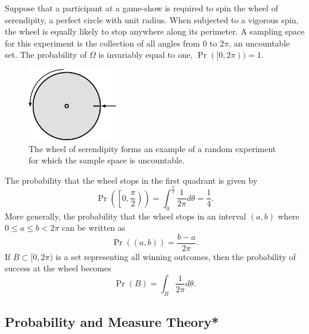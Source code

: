 \begin{example}
Suppose that a participant at a game-show is required to spin the wheel of serendipity, a perfect circle with unit radius.
When subjected to a vigorous spin, the wheel is equally likely to stop anywhere along its perimeter.
A sampling space for this experiment is the collection of all angles from $0$ to $2 \pi$, an uncountable set.
The probability of $\Omega$ is invariably equal to one, $\Pr ([0, 2 \pi)) = 1$.

\begin{figure}[tbh!]
\begin{center}
\includegraphics[height=3.15cm]{Figures/2Chapter/wheel}
\caption{The wheel of serendipity forms an example of a random experiment for which the sample space is uncountable.}
\end{center}
\end{figure}

The probability that the wheel stops in the first quadrant is given by
\begin{equation*}
\Pr \left( \left[ 0, \frac{\pi}{2} \right) \right)
= \int_{0}^{\frac{\pi}{2}} \frac{1}{2 \pi} d\theta
= \frac{1}{4}.
\end{equation*}
More generally, the probability that the wheel stops in an interval $(a, b)$ where $0 \leq a \leq b < 2 \pi$ can be written as
\begin{equation*}
\Pr ((a,b)) = \frac{b - a}{2 \pi}.
\end{equation*}
If $B \subset [0, 2 \pi)$ is a set representing all winning outcomes, then the probability of success at the wheel becomes
\begin{equation*}
\Pr(B) = \int_B \frac{1}{2 \pi} d\theta .
\end{equation*}
\end{example}


\subsection{Probability and Measure Theory*}


